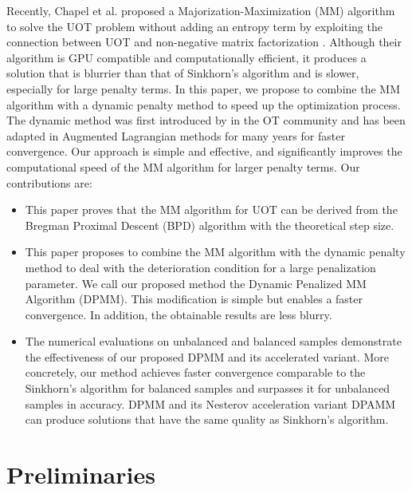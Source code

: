 \documentclass[conference]{IEEEtran}
\begin{document}
Recently, Chapel et al. proposed a Majorization-Maximization (MM) algorithm to solve the UOT problem without adding an entropy term by exploiting the connection between UOT and non-negative matrix factorization \cite{Chapel_NeurIPS_2021}. Although their algorithm is GPU compatible and computationally efficient, it produces a solution that is blurrier than that of Sinkhorn's algorithm and is slower, especially for large penalty terms. In this paper, we propose to combine the MM algorithm with a dynamic penalty method to speed up the optimization process. The dynamic method was first introduced by \cite{pmlr-v115-xie20b} in the OT community and has been adapted in Augmented Lagrangian methods for many years for faster convergence. Our approach is simple and effective, and significantly improves the computational speed of the MM algorithm for larger penalty terms.
Our contributions are:
\begin{itemize}
\item This paper proves that the MM algorithm for UOT can be derived from the Bregman Proximal Descent (BPD) algorithm with the theoretical step size.
\item This paper proposes to combine the MM algorithm with the dynamic penalty method to deal with the deterioration condition for a large penalization parameter. We call our proposed method the Dynamic Penalized MM Algorithm (DPMM). This modification is simple but enables a faster convergence. In addition, the obtainable results are less blurry.
\item The numerical evaluations on unbalanced and balanced samples demonstrate the effectiveness of our proposed DPMM and its accelerated variant. More concretely, our method achieves faster convergence comparable to the Sinkhorn's algorithm for balanced samples and surpasses it for unbalanced samples in accuracy. DPMM and its Nesterov acceleration variant DPAMM can produce solutions that have the same quality as Sinkhorn's algorithm.
\end{itemize}

\section{Preliminaries}
\end{document}
